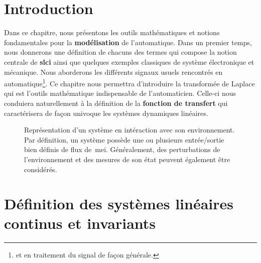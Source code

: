 \section{Introduction}
Dans ce chapitre, nous présentons les outils mathématiques 
et notions fondamentales pour la \textbf{modélisation} de l'automatique.
Dans un premier temps, nous donnerons une définition de chacuns 
des termes qui compose la notion centrale de \textbf{\gls{slci}} 
ainsi que quelques exemples classiques de système électronique et mécanique.
Nous aborderons les différents signaux usuels rencontrés
en automatique\footnote{et en traitement du signal de façon générale.}.
Ce chapitre nous permettra d'introduire la transformée de Laplace qui 
est l'outils mathématique indispensable de l'automaticien.
Celle-ci nous conduiera naturellement à la définition 
de la \textbf{fonction de transfert} qui caractérisera de façon univoque 
les systèmes dynamiques linéaires.
\begin{figure}[!h]
    \centering
    
    \caption{Représentation d'un système en intéraction avec son environnement. 
             Par définition, un système possède une ou plusieurs entrée/sortie 
             bien définis de flux de~\gls{mei}. Généralement, des 
             perturbations de l'environnement et des mesures de son état 
             peuvent également être considérés.\label{fig-systeme}}
\end{figure}
\newpage
{}
\captionsetup{width=0.9\linewidth}
\section[Définition SLCI]
        {Définition des systèmes linéaires continus et invariants}
